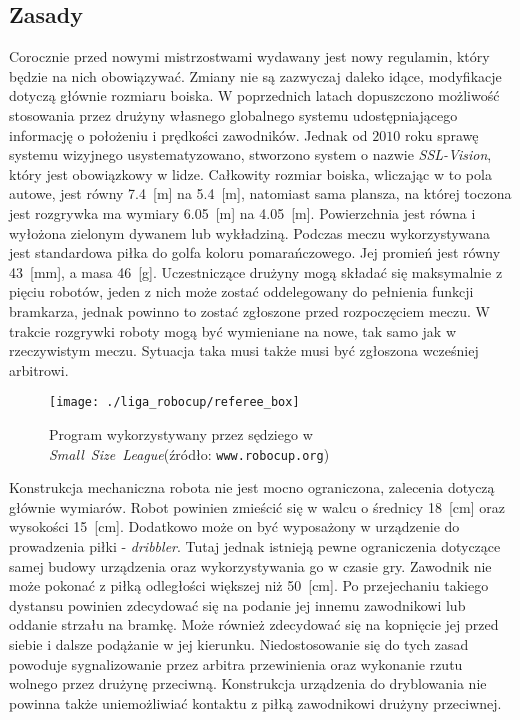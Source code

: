 	\subsection{Zasady}
	Corocznie przed nowymi mistrzostwami wydawany jest nowy regulamin, który będzie na nich obowiązywać. Zmiany nie są zazwyczaj daleko idące, modyfikacje dotyczą głównie rozmiaru boiska.
	W poprzednich latach dopuszczono możliwość stosowania przez drużyny własnego globalnego systemu udostępniającego informację o położeniu i prędkości zawodników.
	Jednak od $2010$ roku sprawę systemu wizyjnego usystematyzowano, stworzono system o nazwie \textit{SSL-Vision}, który jest obowiązkowy w lidze. 
	Całkowity rozmiar boiska, wliczając w to pola autowe, jest równy 7.4~[m] na 5.4~[m], natomiast sama plansza, na której toczona jest rozgrywka ma wymiary 6.05~[m] na 4.05~[m].
	Powierzchnia jest równa i  wyłożona zielonym dywanem lub wykładziną. Podczas meczu wykorzystywana jest standardowa piłka do golfa koloru pomarańczowego. Jej promień jest równy 43~[mm], a masa
	46~[g].
	Uczestniczące drużyny mogą składać się maksymalnie z pięciu robotów, jeden z nich może zostać oddelegowany do pełnienia
	funkcji bramkarza, jednak powinno to zostać zgłoszone przed rozpoczęciem meczu. W trakcie rozgrywki roboty mogą być wymieniane na nowe, tak samo jak w rzeczywistym meczu.  
	Sytuacja taka musi także musi być zgłoszona wcześniej arbitrowi.
	\begin{figure}[h!]
	\centering
	\texttt{[image: ./liga\_robocup/referee\_box]}
	\caption{Program wykorzystywany przez sędziego w  \mbox{\emph{Small Size League}}\newline(źródło: \texttt{www.robocup.org}) }
	\label{fig:referee_box}
	\end{figure} 
	Konstrukcja mechaniczna robota nie jest mocno ograniczona, zalecenia dotyczą głównie wymiarów. Robot powinien zmieścić się w walcu o średnicy 18~[cm] oraz wysokości 15~[cm].
	Dodatkowo może on być wyposażony w urządzenie do prowadzenia piłki - \textit{dribbler}. Tutaj jednak istnieją pewne ograniczenia dotyczące
	samej budowy urządzenia oraz wykorzystywania go w czasie gry. Zawodnik nie może pokonać z piłką odległości większej niż 50~[cm]. Po przejechaniu takiego dystansu powinien zdecydować się
	na podanie jej innemu zawodnikowi lub oddanie strzału na bramkę. Może również zdecydować się na kopnięcie jej przed siebie i dalsze podążanie w jej kierunku. Niedostosowanie się do tych zasad powoduje sygnalizowanie przez arbitra
	przewinienia oraz wykonanie rzutu wolnego przez drużynę przeciwną. Konstrukcja urządzenia do dryblowania nie powinna także uniemożliwiać kontaktu z piłką zawodnikowi drużyny przeciwnej.

